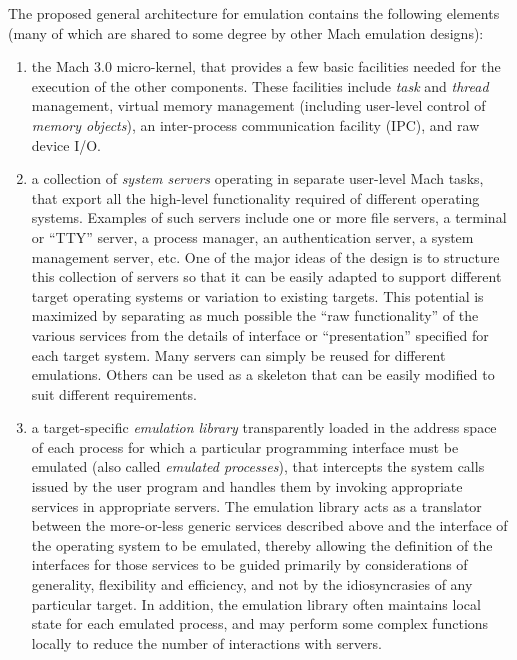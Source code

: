 The proposed general architecture for emulation contains the following
elements (many of which are shared to some degree by other Mach
emulation designs):
\begin{enumerate}

\item the Mach 3.0 micro-kernel, that provides a few basic facilities
needed for the execution of the other components. These facilities
include {\em task} and {\em thread} management, virtual memory
management (including user-level control of {\em memory objects}), an
inter-process communication facility (IPC), and raw device I/O.

\item a collection of {\em system servers} operating in separate
user-level Mach tasks, that export all the high-level functionality
required of different operating systems. Examples of such servers
include one or more file servers, a terminal or ``TTY'' server, a
process manager, an authentication server, a system management server,
etc.  One of the major ideas of the design is to structure this
collection of servers so that it can be easily adapted to support
different target operating systems or variation to existing targets.
This potential is maximized by separating as much possible the ``raw
functionality'' of the various services from the details of interface
or ``presentation'' specified for each target system. Many servers can
simply be reused for different emulations.  Others can be used as a
skeleton that can be easily modified to suit different requirements.

\item a target-specific {\em emulation library} transparently loaded
in the address space of each process for which a particular
programming interface must be emulated (also called {\em emulated
processes}), that intercepts the system calls issued by the user
program and handles them by invoking appropriate services in
appropriate servers.  The emulation library acts as a translator
between the more-or-less generic services described above and the
interface of the operating system to be emulated, thereby allowing the
definition of the interfaces for those services to be guided primarily
by considerations of generality, flexibility and efficiency, and not
by the idiosyncrasies of any particular target. In addition, the
emulation library often maintains local state for each emulated
process, and may perform some complex functions locally to reduce the
number of interactions with servers.

\end{enumerate}

